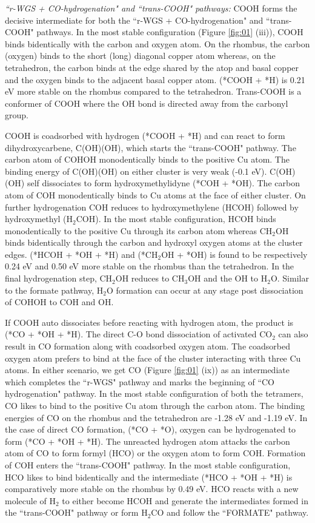 \noindent \textit{``r-WGS + CO-hydrogenation" and ``trans-COOH" pathways:} COOH forms the decisive intermediate for both the ``r-WGS + CO-hydrogenation" and ``trans-COOH" pathways. In the most stable configuration (Figure \ref{fig:01} (iii)), COOH binds bidentically with the carbon and oxygen atom. On the rhombus, the carbon (oxygen) binds to the short (long) diagonal copper atom whereas, on the tetrahedron, the carbon binds at the edge shared by the atop and basal copper and the oxygen binds to the adjacent basal copper atom. (*COOH + *H) is 0.21 eV more stable on the rhombus compared to the tetrahedron. Trans-COOH is a conformer of COOH where the OH bond is directed away from the carbonyl group. 

COOH is coadsorbed with hydrogen (*COOH + *H) and can react to form dihydroxycarbene, C(OH)(OH), which starts the ``trans-COOH" pathway. The carbon atom of COHOH monodentically binds to the positive Cu atom. The binding energy of C(OH)(OH) on either cluster is very weak (-0.1 eV). C(OH)(OH) self dissociates to form hydroxymethylidyne (*COH + *OH). The carbon atom of COH monodentically binds to Cu atoms at the face of either cluster. On further hydrogenation COH reduces to hydroxymethylene (HCOH) followed by hydroxymethyl (H$_2$COH). In the most stable configuration, HCOH binds monodentically to the positive Cu through its carbon atom whereas CH$_2$OH binds bidentically through the carbon and hydroxyl oxygen atoms at the cluster edges. (*HCOH + *OH + *H) and (*CH$_2$OH + *OH) is found to be respectively 0.24 eV and 0.50 eV more stable on the rhombus than the tetrahedron. In the final hydrogenation step, CH$_2$OH reduces to CH$_3$OH and the OH to H$_2$O. Similar to the formate pathway, H$_2$O formation can occur at any stage post dissociation of COHOH to COH and OH. 

If COOH auto dissociates before reacting with hydrogen atom, the product is (*CO + *OH + *H). The direct C-O bond dissociation of activated CO$_2$ can also result in CO formation along with coadsorbed oxygen atom. The coadsorbed oxygen atom prefers to bind at the face of the cluster interacting with three Cu atoms. In either scenario, we get CO (Figure \ref{fig:01} (ix)) as an intermediate which completes the ``r-WGS" pathway and marks the beginning of ``CO hydrogenation" pathway. In the most stable configuration of both the tetramers, CO likes to bind to the positive Cu atom through the carbon atom. The binding energies of CO on the rhombus and the tetrahedron are -1.28 eV and -1.19 eV. In the case of direct CO formation, (*CO + *O), oxygen can be hydrogenated to form (*CO + *OH + *H). The unreacted hydrogen atom attacks the carbon atom of CO to form formyl (HCO) or the oxygen atom to form COH. Formation of COH enters the ``trans-COOH" pathway. In the most stable configuration, HCO likes to bind bidentically and the intermediate (*HCO + *OH + *H) is comparatively more stable on the rhombus by 0.49 eV. HCO reacts with a new molecule of H$_2$ to either become HCOH and generate the intermediates formed in the ``trans-COOH" pathway or form H$_2$CO and follow the ``FORMATE" pathway.

